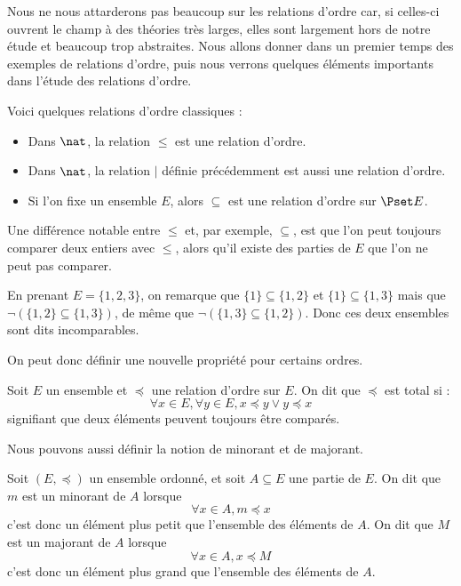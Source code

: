 Nous ne nous attarderons pas beaucoup sur les relations d'ordre car, si celles-ci ouvrent le champ à des théories très larges, elles sont largement hors de notre étude et beaucoup trop abstraites. Nous allons donner dans un premier temps des exemples de relations d'ordre, puis nous verrons quelques éléments importants dans l'étude des relations d'ordre.

\begin{expl}
    Voici quelques relations d'ordre classiques :
    \begin{itemize}[label=$\bullet$]
        \item Dans $\nat$, la relation $\leq$ est une relation d'ordre.
        \item Dans $\nat$, la relation $\mid$ définie précédemment est aussi une relation d'ordre.
        \item Si l'on fixe un ensemble $E$, alors $\subseteq$ est une relation d'ordre sur $\Pset E$.
    \end{itemize}
\end{expl}

Une différence  notable entre $\leq$ et, par exemple, $\subseteq$, est que l'on peut toujours comparer deux entiers avec $\leq$, alors qu'il existe des parties de $E$ que l'on ne peut pas comparer.

\begin{expl}
    En prenant $E=\{1,2,3\}$, on remarque que $\{1\}\subseteq\{1,2\}$ et $\{1\}\subseteq\{1,3\}$ mais que $\lnot(\{1,2\}\subseteq\{1,3\})$, de même que $\lnot(\{1,3\}\subseteq\{1,2\})$. Donc ces deux ensembles sont dits incomparables.
\end{expl}

On peut donc définir une nouvelle propriété pour certains ordres.

\begin{defi}
    Soit $E$ un ensemble et $\preceq$ une relation d'ordre sur $E$. On dit que $\preceq$ est total si :
    $$\forall x\in E,\forall y\in E, x\preceq y \lor y\preceq x$$
    signifiant que deux éléments peuvent toujours être comparés.
\end{defi}

Nous pouvons aussi définir la notion de minorant et de majorant.

\begin{defi}
    Soit $(E,\preceq)$ un ensemble ordonné, et soit $A\subseteq E$ une partie de $E$. On dit que $m$ est un minorant de $A$ lorsque $$\forall x\in A, m\preceq x$$ c'est donc un élément plus petit que l'ensemble des éléments de $A$. On dit que $M$ est un majorant de $A$ lorsque $$\forall x\in A, x\preceq M$$ c'est donc un élément plus grand que l'ensemble des éléments de $A$.
\end{defi}

